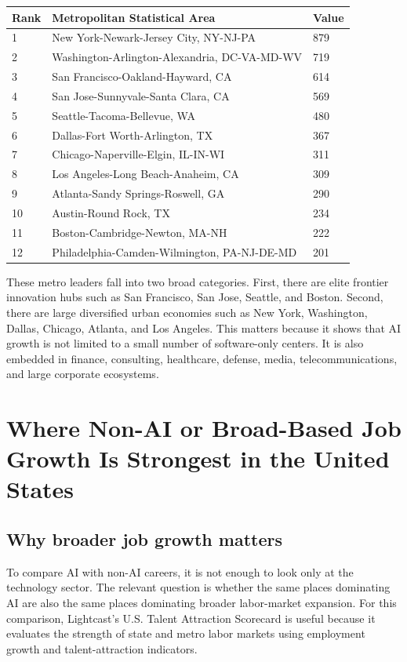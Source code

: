 \documentclass[12pt,a4paper]{article}
\begin{document}
\begin{center}
\begin{tabular}{p{}p{}p{}}
\toprule
\textbf{Rank} & \textbf{Metropolitan Statistical Area} & \textbf{Value} \\
\midrule
1 & New York-Newark-Jersey City, NY-NJ-PA & 879 \\
2 & Washington-Arlington-Alexandria, DC-VA-MD-WV & 719 \\
3 & San Francisco-Oakland-Hayward, CA & 614 \\
4 & San Jose-Sunnyvale-Santa Clara, CA & 569 \\
5 & Seattle-Tacoma-Bellevue, WA & 480 \\
6 & Dallas-Fort Worth-Arlington, TX & 367 \\
7 & Chicago-Naperville-Elgin, IL-IN-WI & 311 \\
8 & Los Angeles-Long Beach-Anaheim, CA & 309 \\
9 & Atlanta-Sandy Springs-Roswell, GA & 290 \\
10 & Austin-Round Rock, TX & 234 \\
11 & Boston-Cambridge-Newton, MA-NH & 222 \\
12 & Philadelphia-Camden-Wilmington, PA-NJ-DE-MD & 201 \\
\bottomrule
\end{tabular}
\end{center}

These metro leaders fall into two broad categories. First, there are elite frontier innovation hubs such as San Francisco, San Jose, Seattle, and Boston. Second, there are large diversified urban economies such as New York, Washington, Dallas, Chicago, Atlanta, and Los Angeles. This matters because it shows that AI growth is not limited to a small number of software-only centers. It is also embedded in finance, consulting, healthcare, defense, media, telecommunications, and large corporate ecosystems.

\section{Where Non-AI or Broad-Based Job Growth Is Strongest in the United States}

\subsection{Why broader job growth matters}

To compare AI with non-AI careers, it is not enough to look only at the technology sector. The relevant question is whether the same places dominating AI are also the same places dominating broader labor-market expansion. For this comparison, Lightcast's U.S. Talent Attraction Scorecard is useful because it evaluates the strength of state and metro labor markets using employment growth and talent-attraction indicators.
\end{document}
